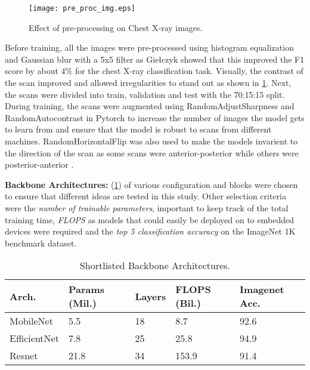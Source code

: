 \documentclass[10pt,twocolumn,letterpaper]{article}
\begin{document}
\begin{figure}[t]
  \centering
  \texttt{[image: pre\_proc\_img.eps]}  
   \caption{Effect of pre-processing on Chest X-ray images.}
   \label{fig:pre_proc_img}
\end{figure}

Before training, all the images were pre-processed using histogram equalization and Gaussian blur 
with a 5x5 filter as Giełczyk \etal \cite{gielczyk2022pre} showed that this improved the 
F1 score by about 4\% for the chest X-ray classification task. Visually, the contrast of the scan improved 
and allowed irregularities to stand out as shown in \cref{fig:pre_proc_img}. Next, the 
scans were divided into train, validation and test with the 70:15:15 split. 
During training, the scans were augmented using RandomAdjustSharpness and 
RandomAutocontrast in Pytorch to increase the number of images the 
model gets to learn from and ensure that the model is robust to scans from different machines.
RandomHorizontalFlip was also used to make the models invarient to the direction of the scan as 
some scans were anterior-posterior while others were posterior-anterior \cite{botev2022regularising}.

\textbf{Backbone Architectures:} (\cref{tab:selArch}) of various configuration and blocks were chosen 
to ensure that different ideas are tested in this study. 
Other selection criteria were the \textit{number of trainable parameters}, important to keep track of 
the total training time, \textit{FLOPS} as models that could easily be 
deployed on to embedded devices were required and the \textit{top 5 classification accuracy} on the ImageNet 
1K benchmark dataset.

\begin{table}
  \centering
  \begin{tabular}{p{1.7cm}|p{1cm}|p{1cm}|p{1cm}|p{1cm}}
  \toprule
  Arch. & Params (Mil.) & Layers & FLOPS (Bil.) & Imagenet Acc.\\
  \midrule
  MobileNet & 5.5 & 18 & 8.7 & 92.6\\
  \midrule
  EfficientNet & 7.8 & 25 & 25.8 & 94.9\\
  \midrule
  Resnet & 21.8 & 34 & 153.9 & 91.4\\
  \bottomrule
  \end{tabular}
  \caption{Shortlisted Backbone Architectures.}
  \label{tab:selArch}
\end{table}
\end{document}
